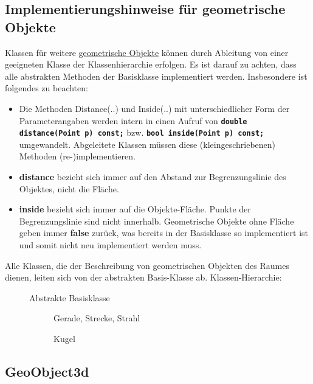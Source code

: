 \subsection{Implementierungshinweise für geometrische Objekte}
Klassen für weitere \hyperlink{SECTION:geoObject}{geometrische Objekte} können 
durch Ableitung von einer geeigneten Klasse der Klassenhierarchie 
 erfolgen. Es ist darauf zu achten, dass
alle abstrakten Methoden der Basisklasse implementiert werden. 
Insbesondere ist folgendes zu beachten:
\begin{itemize}
\item Die Methoden Distance(..) und Inside(..) mit unterschiedlicher Form 
der Parameterangaben werden intern in einen Aufruf von 
{\bf \verb+double distance(Point p) const;+} bzw.
{\bf \verb+bool inside(Point p) const;+} umgewandelt. Abgeleitete 
Klassen müssen diese (kleingeschriebenen) Methoden (re-)implementieren.
\item {\bf distance} bezieht sich immer auf den Abstand zur Begrenzungslinie 
des Objektes, nicht die Fläche.
\item {\bf inside} bezieht sich immer auf die Objekte-Fläche. Punkte der 
Begrenzungslinie sind nicht innerhalb. Geometrische Objekte ohne Fläche 
geben immer {\bf false} zurück, was bereits in der Basisklasse 
 so implementiert ist und somit nicht neu implementiert 
werden muss.
\end{itemize}

\label{Geometrisches3DObjekt}
\hypertarget{geometric3dObject}{}

Alle Klassen, die der Beschreibung von geometrischen Objekten des Raumes 
dienen, leiten sich von der abstrakten Basis-Klasse  ab.
\vspace{1cm}
\noindent
Klassen-Hierarchie:

\begin{description}
\item[] Abstrakte Basisklasse
\begin{description}
\item[] Gerade, Strecke, Strahl
\item[] Kugel
\end{description}
\end{description}

\subsection{GeoObject3d}
\label{GeoObject3d}
\hypertarget{GeoObject3d}{}

